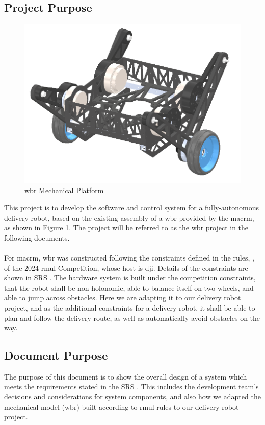 \documentclass[12pt]{article}
\begin{document}
\subsection{Project Purpose} \label{sec:Project Purpose}
\begin{figure}[H]
    \centering
    \includegraphics[scale=0.7]{../Mechanical Platform.png}
    \caption{\acrshort{wbr} Mechanical Platform}
    \label{fig:Mechanical Platform}
\end{figure}
This project is to develop the software and control system for a fully-autonomous delivery robot, based on the existing assembly of a \acrfull{wbr} provided by the \acrfull{macrm}, as shown in Figure \ref{fig:Mechanical Platform}. The project will be referred to as the \acrshort{wbr} project in the following documents.\\\\
For \acrshort{macrm}, \acrshort{wbr} was constructed following the constraints defined in the rules, \citet{RmuBuildSpecs2024}, of the 2024 \acrfull{rmul} Competition, whose host is \acrfull{dji}. Details of the constraints are shown in SRS \cite[see][Design Constraints]{SRS2023}. The hardware system is built under the competition constraints, that the robot shall be non-holonomic, able to balance itself on two wheels, and able to jump across obstacles. Here we are adapting it to our delivery robot project, and as the additional constraints for a delivery robot, it shall be able to plan and follow the delivery route, as well as automatically avoid obstacles on the way.

\subsection{Document Purpose}
The purpose of this document is to show the overall design of a system which meets the requirements stated in the SRS \cite[][]{SRS2023}. This includes the development team's decisions and considerations for system components, and also how we adapted the mechanical model (\acrshort{wbr}) built according to \acrfull{rmul} rules to our delivery robot project.
\end{document}
